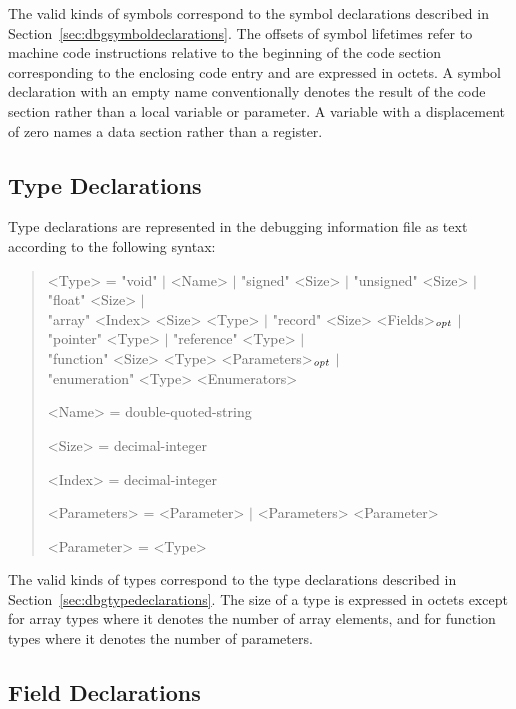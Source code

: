 The valid kinds of symbols correspond to the symbol declarations described in Section~\ref{sec:dbgsymboldeclarations}.
The offsets of symbol lifetimes refer to machine code instructions relative to the beginning of the code section corresponding to the enclosing code entry and are expressed in octets.
A symbol declaration with an empty name conventionally denotes the result of the code section rather than a local variable or parameter.
A variable with a displacement of zero names a data section rather than a register.

\subsection{Type Declarations}

Type declarations are represented in the debugging information file as text according to the following syntax:

\begin{quote}\begin{grammar}
<Type> = "void" $\mid$ <Name> $\mid$ "signed" <Size> $\mid$ "unsigned" <Size> $\mid$ "float" <Size> $\mid$ \\ "array" <Index> <Size> <Type> $\mid$ "record" <Size> <Fields>$_\mathit{opt}$ $\mid$ \\ "pointer" <Type> $\mid$ "reference" <Type> $\mid$ \\ "function" <Size> <Type> <Parameters>$_\mathit{opt}$ $\mid$ \\ "enumeration" <Type> <Enumerators> \par
<Name> = double-quoted-string \par
<Size> = decimal-integer \par
<Index> = decimal-integer \par
<Parameters> = <Parameter> $\mid$ <Parameters> <Parameter> \par
<Parameter> = <Type> \par
\end{grammar}\end{quote}

The valid kinds of types correspond to the type declarations described in Section~\ref{sec:dbgtypedeclarations}.
The size of a type is expressed in octets except for array types where it denotes the number of array elements, and for function types where it denotes the number of parameters.

\subsection{Field Declarations}

